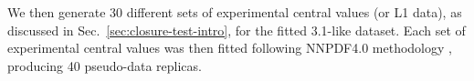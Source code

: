 We then generate 30 different sets of experimental central values
(or L1 data), as discussed in Sec.~\ref{sec:closure-test-intro}, for the
fitted 3.1-like dataset.
Each set of experimental central values was then
fitted following NNPDF4.0 methodology \cite{NNPDF40},
producing 40 pseudo-data replicas.